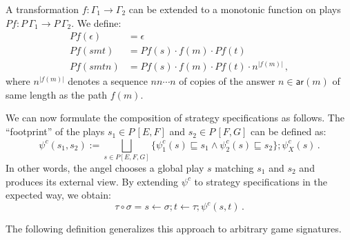 \documentclass[format=sigplan,authordraft]{acmart}
\newcommand{\kw}[1]{\ensuremath{ \mathsf{#1} }}
\begin{document}
\begin{definition}
A transformation
$f : \Gamma_1 \rightarrow \Gamma_2$
can be extended to a monotonic function on plays
$P f  : P \, {\Gamma}_1 \rightarrow P \, {\Gamma}_2$.
We define:
\begin{align*}
  P f (\epsilon) &= \epsilon \\
  P f (smt) &= P f (s) \cdot f(m) \cdot P f (t) \\
  P f (smtn) &= P f (s) \cdot f(m) \cdot P f (t) \cdot n^{|f(m)|} \,,
\end{align*}
where $n^{|f(m)|}$ denotes a sequence $nn \cdots n$
of copies of the answer $n \in \kw{ar}(m)$
of same length as the path $f(m)$.
\end{definition}

We can now formulate the composition of strategy specifications as follows.
The ``footprint'' of the plays $s_1 \in P \, [E,F]$ and $s_2 \in P \, [F,G]$
can be defined as:
\[
  \psi^c(s_1, s_2) :=
    \bigsqcup_{s \in P [E,F,G]}
    \{ \psi^c_1(s) \sqsubseteq s_1 \wedge \psi^c_2(s) \sqsubseteq s_2 \} ;
    \psi^c_X(s) \,.
\]
In other words,
the angel chooses a global play $s$
matching $s_1$ and $s_2$
and produces its external view.
By extending $\psi^c$ to strategy specifications
in the expected way, we obtain:
\[
  \tau \circ \sigma = 
    s \leftarrow \sigma ;
    t \leftarrow \tau ;
    \psi^c(s, t) \,.
\]

The following definition
generalizes this approach to arbitrary game signatures.
\end{document}
